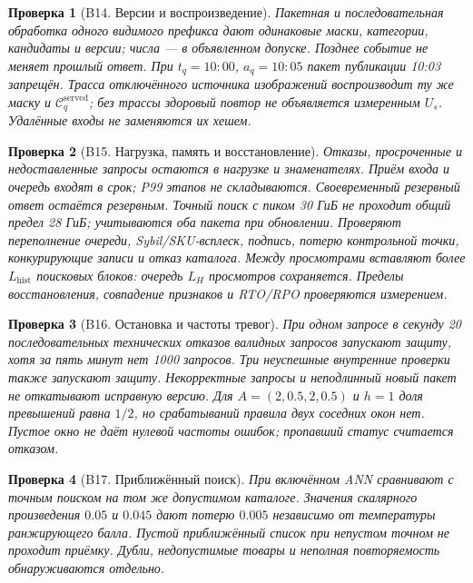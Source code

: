 \documentclass[12pt,a4paper]{article}
\theoremstyle{plainru}
\newtheorem{testcase}{Проверка}[section]
\begin{document}
\begin{testcase}[B14. Версии и воспроизведение]
Пакетная и последовательная обработка одного видимого префикса
дают одинаковые маски, категории, кандидаты и версии; числа ---
в объявленном допуске. Позднее событие не меняет прошлый ответ.
При $t_q=10{:}00$, $a_q=10{:}05$ пакет публикации 10:03 запрещён.
Трасса отключённого источника изображений воспроизводит ту же
маску и $\mathcal C_q^{\mathrm{served}}$; без трассы здоровый повтор
не объявляется измеренным $U_s$. Удалённые входы не заменяются их хешем.
\end{testcase}

\begin{testcase}[B15. Нагрузка, память и восстановление]
Отказы, просроченные и недоставленные запросы остаются в нагрузке
и знаменателях. Приём входа и очередь входят в срок; P99 этапов
не складываются. Своевременный резервный ответ остаётся резервным.
Точный поиск с пиком 30 ГиБ не проходит общий предел 28 ГиБ;
учитываются оба пакета при обновлении.
Проверяют переполнение очереди, Sybil/SKU-всплеск, подпись, потерю
контрольной точки, конкурирующие записи и отказ каталога.
Между просмотрами вставляют более $L_{\mathrm{hist}}$ поисковых блоков:
очередь $L_H$ просмотров сохраняется. Пределы восстановления,
совпадение признаков и RTO/RPO проверяются измерением.
\end{testcase}

\begin{testcase}[B16. Остановка и частоты тревог]
При одном запросе в секунду 20 последовательных технических отказов
валидных запросов запускают защиту, хотя за пять минут нет 1000 запросов.
Три неуспешные внутренние проверки также запускают защиту.
Некорректные запросы и неподлинный новый пакет не откатывают исправную версию.
Для $A=(2,0.5,2,0.5)$ и $h=1$ доля превышений равна $1/2$,
но срабатываний правила двух соседних окон нет.
Пустое окно не даёт нулевой частоты ошибок; пропавший статус считается отказом.
\end{testcase}

\begin{testcase}[B17. Приближённый поиск]
При включённом ANN сравнивают с точным поиском на том же допустимом
каталоге. Значения скалярного произведения $0.05$ и $0.045$ дают
потерю $0.005$ независимо от температуры ранжирующего балла.
Пустой приближённый список при непустом точном не проходит приёмку.
Дубли, недопустимые товары и неполная повторяемость обнаруживаются отдельно.
\end{testcase}
\end{document}
